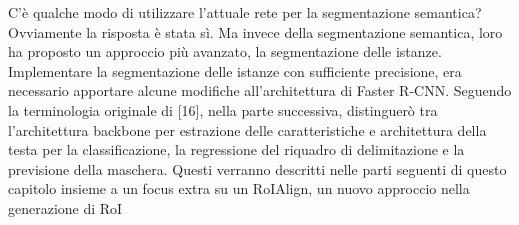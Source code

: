 \cite{he2017mask}

C'è qualche modo di utilizzare l'attuale rete per la segmentazione semantica? Ovviamente la risposta è stata sì. Ma invece della segmentazione semantica, loro ha proposto un approccio più avanzato, la segmentazione delle istanze. Implementare la segmentazione delle istanze con sufficiente precisione, era necessario apportare alcune modifiche all'architettura di Faster R-CNN. Seguendo la terminologia originale di [16], nella parte successiva, distinguerò tra l'architettura backbone per estrazione delle caratteristiche e architettura della testa per la classificazione, la regressione del riquadro di delimitazione e la previsione della maschera. Questi verranno descritti nelle parti seguenti di questo capitolo insieme a un focus extra su un RoIAlign, un nuovo approccio nella generazione di RoI